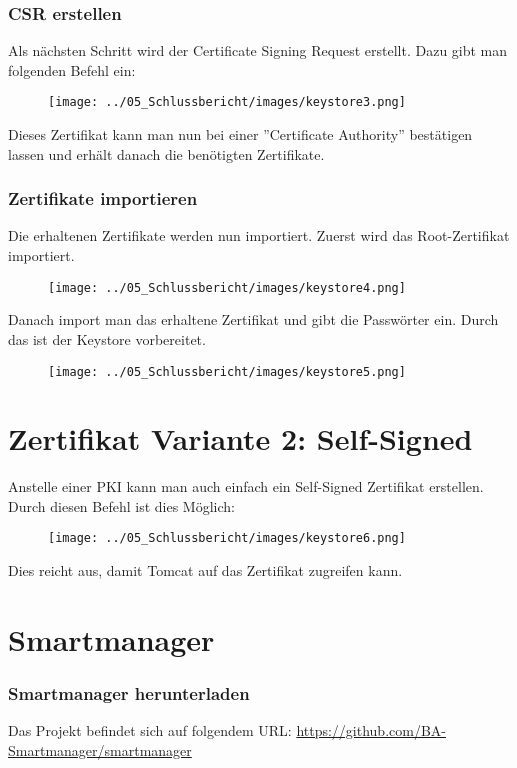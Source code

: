 \subsubsection{CSR erstellen}
Als nächsten Schritt wird der Certificate Signing Request erstellt. Dazu gibt man folgenden Befehl ein:
\begin{figure}[H]
\centering
\texttt{[image: ../05\_Schlussbericht/images/keystore3.png]}
\end{figure}


Dieses Zertifikat kann man nun bei einer ''Certificate Authority'' bestätigen lassen und erhält danach die benötigten Zertifikate.
\subsubsection{Zertifikate importieren}
Die erhaltenen Zertifikate werden nun importiert. Zuerst wird das Root-Zertifikat importiert.
\begin{figure}[H]
\centering
\texttt{[image: ../05\_Schlussbericht/images/keystore4.png]}
\end{figure}

Danach import man das erhaltene Zertifikat und gibt die Passwörter ein. Durch das ist der Keystore vorbereitet.
\begin{figure}[H]
\centering
\texttt{[image: ../05\_Schlussbericht/images/keystore5.png]}
\end{figure}
\section{Zertifikat Variante 2: Self-Signed}
Anstelle einer PKI kann man auch einfach ein Self-Signed Zertifikat erstellen. Durch diesen Befehl ist dies Möglich:
\begin{figure}[H]
\centering
\texttt{[image: ../05\_Schlussbericht/images/keystore6.png]}
\end{figure}

Dies reicht aus, damit Tomcat auf das Zertifikat zugreifen kann.

\newpage


\section{Smartmanager}
\subsubsection{Smartmanager herunterladen}
Das Projekt befindet sich auf folgendem URL: \href{https://github.com/BA-Smartmanager/smartmanager}{https://github.com/BA-Smartmanager/smartmanager}


